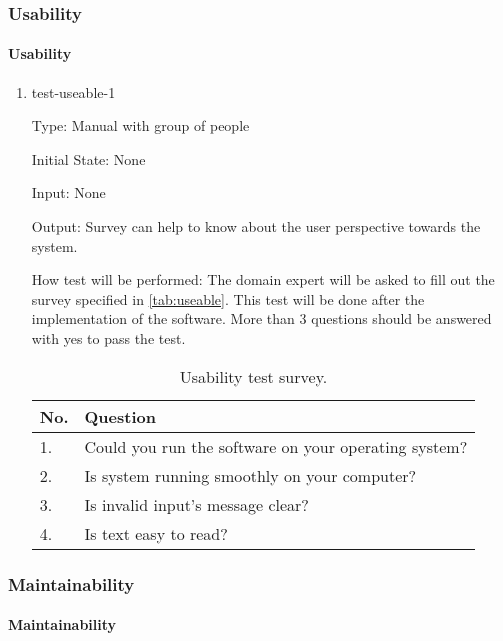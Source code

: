 \documentclass[12pt, titlepage]{article}
\begin{document}
\subsubsection{Usability}

\paragraph{Usability}

\begin{enumerate}

\item{test-useable-1\\}

Type: Manual with group of people
					
Initial State: None 
					
Input: None 
					
Output: Survey can help to know about the user perspective towards the system. 

How test will be performed: The domain expert will be asked to fill out the survey
specified in \autoref{tab:useable}. This test will be done after the implementation 
of the software. More than 3 questions should be answered with yes to pass the test.

\begin{table}[!h]
  \centering
  \caption{Usability test survey.}
  \label{tab:useable}
  \begin{tabular}{ p{0.5cm}|p{10cm} }
    \hline
    No. &  Question                                             \\
    \hline
    1. & Could you run the software on your operating system?   \\
    2. & Is system running smoothly on your computer?           \\
    3. & Is invalid input's message clear?                      \\
    4. & Is text easy to read?                                  \\
    \hline
    \end{tabular}
\end{table}

\end{enumerate}

\subsubsection{Maintainability}

\paragraph{Maintainability}
\end{document}

